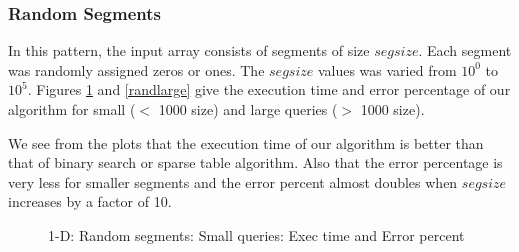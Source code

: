 \documentclass{article}
\begin{document}
\subsubsection{Random Segments}
In this pattern, the input array consists of segments of size $segsize$. Each segment was randomly assigned zeros or ones. The $segsize$ values was varied from $10^0$ to $10^5$. Figures \ref{randsmall} and \ref{randlarge} give the execution time and error percentage of our algorithm for small ($<$ 1000 size) and large queries ($>$ 1000 size).

We see from the plots that the execution time of our algorithm is better than that of binary search or sparse table algorithm. Also that the error percentage is very less for smaller segments and the error percent almost doubles when $segsize$ increases by a factor of 10.

\begin{figure}
\mbox{}
\caption{1-D: Random segments: Small queries: Exec time and Error percent} \label{randsmall}
\end{figure}
\end{document}
